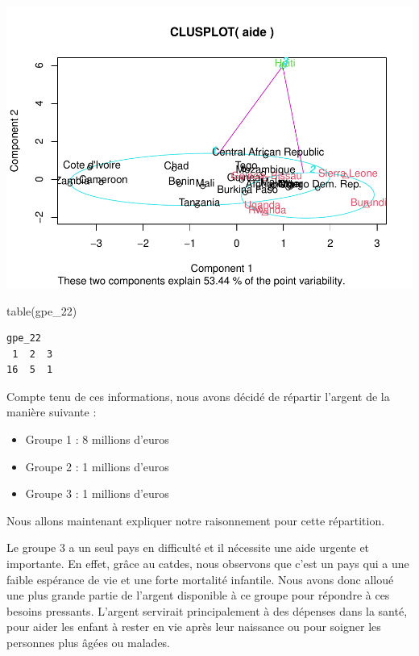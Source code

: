 \documentclass[
]{article}
\newenvironment{Shaded}{}{}
\newcommand{\FunctionTok}[1]{#1}
\newcommand{\NormalTok}[1]{#1}
\begin{document}
\includegraphics{Projet_files/figure-latex/unnamed-chunk-44-1.pdf}

\begin{Shaded}
\begin{Highlighting}[]
\FunctionTok{table}\NormalTok{(gpe\_22)}
\end{Highlighting}
\end{Shaded}

\begin{verbatim}
gpe_22
 1  2  3 
16  5  1 
\end{verbatim}

Compte tenu de ces informations, nous avons décidé de répartir l'argent
de la manière suivante :

\begin{itemize}
\item
  Groupe 1 : 8 millions d'euros
\item
  Groupe 2 : 1 millions d'euros
\item
  Groupe 3 : 1 millions d'euros
\end{itemize}

Nous allons maintenant expliquer notre raisonnement pour cette
répartition.

Le groupe 3 a un seul pays en difficulté et il nécessite une aide
urgente et importante. En effet, grâce au catdes, nous observons que
c'est un pays qui a une faible espérance de vie et une forte mortalité
infantile. Nous avons donc alloué une plus grande partie de l'argent
disponible à ce groupe pour répondre à ces besoins pressants. L'argent
servirait principalement à des dépenses dans la santé, pour aider les
enfant à rester en vie après leur naissance ou pour soigner les
personnes plus âgées ou malades.
\end{document}
